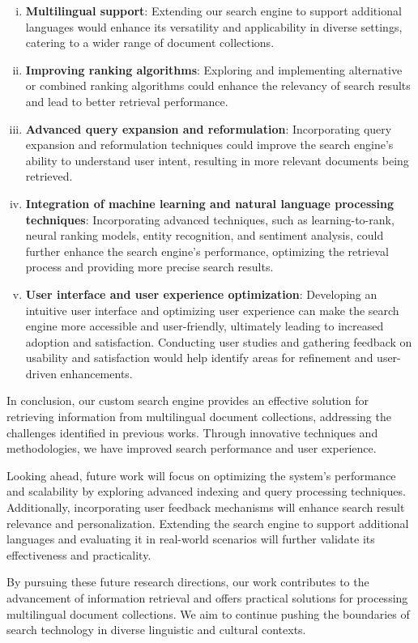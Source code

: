 \begin{enumerate}[i.]
\item \textbf{Multilingual support}: Extending our search engine to support additional languages would enhance its versatility and applicability in diverse settings, catering to a wider range of document collections.

\item \textbf{Improving ranking algorithms}: Exploring and implementing alternative or combined ranking algorithms could enhance the relevancy of search results and lead to better retrieval performance.

\item \textbf{Advanced query expansion and reformulation}: Incorporating query expansion and reformulation techniques could improve the search engine's ability to understand user intent, resulting in more relevant documents being retrieved.

\item \textbf{Integration of machine learning and natural language processing techniques}: Incorporating advanced techniques, such as learning-to-rank, neural ranking models, entity recognition, and sentiment analysis, could further enhance the search engine's performance, optimizing the retrieval process and providing more precise search results.

\item \textbf{User interface and user experience optimization}: Developing an intuitive user interface and optimizing user experience can make the search engine more accessible and user-friendly, ultimately leading to increased adoption and satisfaction. Conducting user studies and gathering feedback on usability and satisfaction would help identify areas for refinement and user-driven enhancements.
\end{enumerate}

In conclusion, our custom search engine provides an effective solution for retrieving information from multilingual document collections, addressing the challenges identified in previous works. Through innovative techniques and methodologies, we have improved search performance and user experience.

Looking ahead, future work will focus on optimizing the system's performance and scalability by exploring advanced indexing and query processing techniques. Additionally, incorporating user feedback mechanisms will enhance search result relevance and personalization. Extending the search engine to support additional languages and evaluating it in real-world scenarios will further validate its effectiveness and practicality.

By pursuing these future research directions, our work contributes to the advancement of information retrieval and offers practical solutions for processing multilingual document collections. We aim to continue pushing the boundaries of search technology in diverse linguistic and cultural contexts.